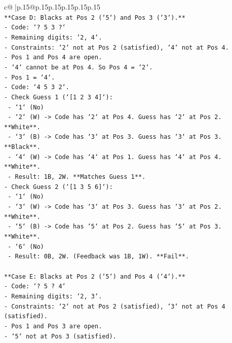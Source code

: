 \documentclass{article}
\begin{document}
{\begin{supertabular}{c@{$\;$}|p{.15\linewidth}@{}p{.15\linewidth}p{.15\linewidth}p{.15\linewidth}p{.15\linewidth}p{.15\linewidth}}
{{{\\ 
\texttt{**Case D: Blacks at Pos 2 (`5`) and Pos 3 (`3`).**} \\
\texttt{{-}   Code: `? 5 3 ?`} \\
\texttt{{-}   Remaining digits: `2, 4`.} \\
\texttt{{-}   Constraints: `2` not at Pos 2 (satisfied), `4` not at Pos 4.} \\
\texttt{{-}   Pos 1 and Pos 4 are open.} \\
\texttt{{-}   `4` cannot be at Pos 4. So Pos 4 = `2`.} \\
\texttt{{-}   Pos 1 = `4`.} \\
\texttt{{-}   Code: `4 5 3 2`.} \\
\texttt{{-}   Check Guess 1 (`{[}1 2 3 4{]}`):} \\
\texttt{    {-}   `1` (No)} \\
\texttt{    {-}   `2` (W) {-}> Code has `2` at Pos 4. Guess has `2` at Pos 2. **White**.} \\
\texttt{    {-}   `3` (B) {-}> Code has `3` at Pos 3. Guess has `3` at Pos 3. **Black**.} \\
\texttt{    {-}   `4` (W) {-}> Code has `4` at Pos 1. Guess has `4` at Pos 4. **White**.} \\
\texttt{    {-}   Result: 1B, 2W. **Matches Guess 1**.} \\
\texttt{{-}   Check Guess 2 (`{[}1 3 5 6{]}`):} \\
\texttt{    {-}   `1` (No)} \\
\texttt{    {-}   `3` (W) {-}> Code has `3` at Pos 3. Guess has `3` at Pos 2. **White**.} \\
\texttt{    {-}   `5` (B) {-}> Code has `5` at Pos 2. Guess has `5` at Pos 3. **White**.} \\
\texttt{    {-}   `6` (No)} \\
\texttt{    {-}   Result: 0B, 2W. (Feedback was 1B, 1W). **Fail**.} \\
\\ 
\texttt{**Case E: Blacks at Pos 2 (`5`) and Pos 4 (`4`).**} \\
\texttt{{-}   Code: `? 5 ? 4`} \\
\texttt{{-}   Remaining digits: `2, 3`.} \\
\texttt{{-}   Constraints: `2` not at Pos 2 (satisfied), `3` not at Pos 4 (satisfied).} \\
\texttt{{-}   Pos 1 and Pos 3 are open.} \\
\texttt{{-}   `5` not at Pos 3 (satisfied).} \\
}}}
\end{supertabular}}
\end{document}
